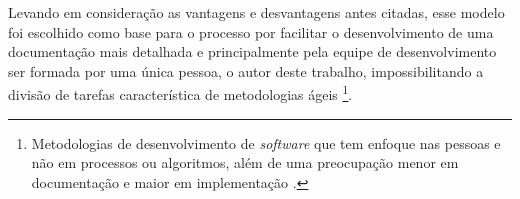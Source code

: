 Levando em consideração as vantagens e desvantagens antes citadas, esse modelo foi escolhido como base para o processo por facilitar o desenvolvimento de uma documentação mais detalhada e 
principalmente pela equipe de desenvolvimento ser formada por uma única pessoa, o autor deste trabalho, impossibilitando a divisão de tarefas característica de metodologias 
ágeis \footnote{Metodologias de desenvolvimento de \textit{software} que tem enfoque nas pessoas e não em processos ou algoritmos, além de uma preocupação menor em documentação e maior em implementação 
\cite{michel2004metodologias}.}.

\begin{figure}[H]
    \centering
\end{figure}


